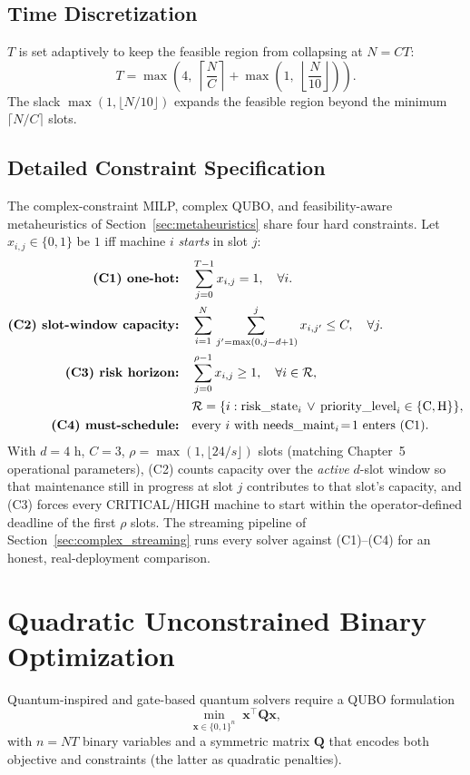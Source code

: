 \subsection{Time Discretization}
$T$ is set adaptively to keep the feasible region from collapsing at $N = C T$:
\begin{equation}
T = \max\!\left(4,\; \left\lceil \frac{N}{C} \right\rceil + \max\!\left(1,\; \left\lfloor \frac{N}{10} \right\rfloor \right) \right).
\end{equation}
The slack $\max(1,\lfloor N/10 \rfloor)$ expands the feasible region beyond the minimum $\lceil N/C \rceil$ slots.

\subsection{Detailed Constraint Specification}
\label{sec:constraint_specification}

The complex-constraint MILP, complex QUBO, and feasibility-aware metaheuristics of Section~\ref{sec:metaheuristics} share four hard constraints. Let $x_{i,j} \in \{0,1\}$ be $1$ iff machine $i$ \emph{starts} in slot $j$:
\begin{align}
\textbf{(C1) one-hot:} \quad &
\sum_{j=0}^{T-1} x_{i,j} = 1, \quad \forall i.
\\
\textbf{(C2) slot-window capacity:} \quad &
\sum_{i=1}^{N} \sum_{\,j' = \max(0, j-d+1)}^{j} x_{i,j'} \leq C,
\quad \forall j.
\\
\textbf{(C3) risk horizon:} \quad &
\sum_{j=0}^{\rho - 1} x_{i,j} \geq 1, \quad
\forall i \in \mathcal{R}, \notag \\
& \mathcal{R} = \{ i : \mathrm{risk\_state}_i \,\vee\,
  \mathrm{priority\_level}_i \in \{\mathrm{C, H}\}\}, \notag \\
\textbf{(C4) must-schedule:} \quad &
\text{every } i \text{ with } \mathrm{needs\_maint}_i\!=\!1 \text{ enters (C1)}. \notag
\end{align}
With $d=4$ h, $C=3$, $\rho = \max(1, \lfloor 24 / s \rfloor)$ slots (matching Chapter~5 operational parameters), (C2) counts capacity over the \emph{active} $d$-slot window so that maintenance still in progress at slot $j$ contributes to that slot's capacity, and (C3) forces every CRITICAL/HIGH machine to start within the operator-defined deadline of the first $\rho$ slots. The streaming pipeline of Section~\ref{sec:complex_streaming} runs every solver against (C1)--(C4) for an honest, real-deployment comparison.

\section{Quadratic Unconstrained Binary Optimization}
Quantum-inspired and gate-based quantum solvers require a QUBO formulation
\begin{equation}
\min_{\mathbf{x} \in \{0,1\}^n} \; \mathbf{x}^\top \mathbf{Q} \mathbf{x},
\end{equation}
with $n = N T$ binary variables and a symmetric matrix $\mathbf{Q}$ that encodes both objective and constraints (the latter as quadratic penalties).

